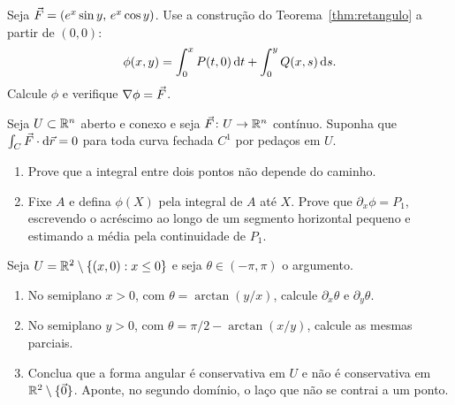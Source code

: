 \documentclass[11pt,a4paper]{article}
\begin{document}
\begin{exercicio}
Seja $\vec{F}=(e^x\sin y,\, e^x\cos y)$. Use a construção do Teorema~\ref{thm:retangulo} a partir de $(0,0)$:
\[
\phi(x,y)=\int_0^x P(t,0)\,\mathrm{d} t+\int_0^y Q(x,s)\,\mathrm{d} s.
\]
Calcule $\phi$ e verifique $\nabla\phi=\vec{F}$.
\end{exercicio}

\begin{exercicio}
Seja $U\subset\mathbb{R}^n$ aberto e conexo e seja $\vec{F}\colon U\to\mathbb{R}^n$ contínuo. Suponha que $\int_C\vec{F}\cdot\mathrm{d}\vec{r}=0$ para toda curva fechada $C^1$ por pedaços em $U$.
\begin{enumerate}
\item Prove que a integral entre dois pontos não depende do caminho.
\item Fixe $A$ e defina $\phi(X)$ pela integral de $A$ até $X$. Prove que $\partial_x\phi=P_1$, escrevendo o acréscimo ao longo de um segmento horizontal pequeno e estimando a média pela continuidade de $P_1$.
\end{enumerate}
\end{exercicio}

\begin{exercicio}
Seja $U=\mathbb{R}^2\setminus\{(x,0):x\le 0\}$ e seja $\theta\in(-\pi,\pi)$ o argumento.
\begin{enumerate}
\item No semiplano $x>0$, com $\theta=\arctan(y/x)$, calcule $\partial_x\theta$ e $\partial_y\theta$.
\item No semiplano $y>0$, com $\theta=\pi/2-\arctan(x/y)$, calcule as mesmas parciais.
\item Conclua que a forma angular é conservativa em $U$ e não é conservativa em $\mathbb{R}^2\setminus\{\vec{0}\}$. Aponte, no segundo domínio, o laço que não se contrai a um ponto.
\end{enumerate}
\end{exercicio}
\end{document}

